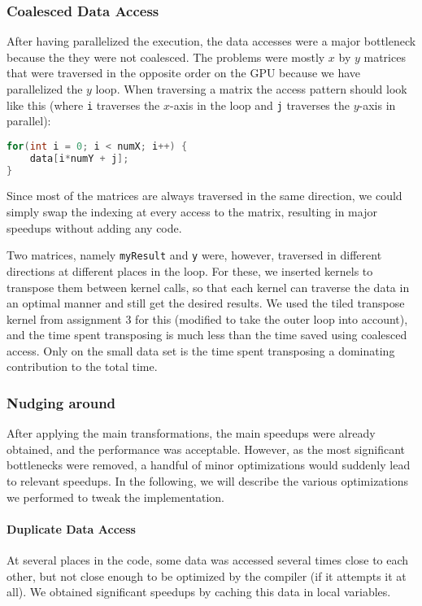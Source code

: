 \documentclass[11pt]{article}
\begin{document}
\subsubsection{Coalesced Data Access}
After having parallelized the execution, the data accesses were a major bottleneck because the they were not coalesced.
The problems were mostly $x$ by $y$ matrices that were traversed in the opposite order on the GPU because we have parallelized the $y$ loop.
When traversing a matrix the access pattern should look like this (where \texttt{i} traverses the $x$-axis in the loop and \texttt{j} traverses the $y$-axis in parallel):
\begin{lstlisting}[language=C]
for(int i = 0; i < numX; i++) {
	data[i*numY + j];
}
\end{lstlisting}

Since most of the matrices are always traversed in the same direction, we could simply swap the indexing at every access to the matrix, resulting in major speedups without adding any code.

Two matrices, namely \texttt{myResult} and \texttt{y} were, however, traversed in different directions at different places in the loop.
For these, we inserted kernels to transpose them between kernel calls, so that each kernel can traverse the data in an optimal manner and still get the desired results.
We used the tiled transpose kernel from assignment 3 for this (modified to take the outer loop into account), and the time spent transposing is much less than the time saved using coalesced access.
Only on the small data set is the time spent transposing a dominating contribution to the total time.


\subsubsection{Nudging around}

After applying the main transformations, the main speedups were already obtained, and the performance was acceptable.
However, as the most significant bottlenecks were removed, a handful of minor optimizations would suddenly lead to relevant speedups.
In the following, we will describe the various optimizations we performed to tweak the implementation.


\paragraph{Duplicate Data Access\\}
At several places in the code, some data was accessed several times close to each other, but not close enough to be optimized by the compiler (if it attempts it at all).
We obtained significant speedups by caching this data in local variables.
\end{document}
